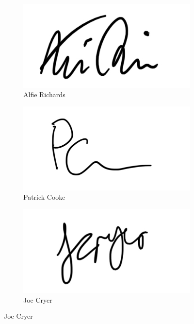 \documentclass[10pt]{article}
\begin{document}
\begin{center}
\begin{figure}[h]
  \centering

\begin{subfigure}{0.3\textwidth}
\includegraphics[width=0.9\linewidth]{SigAlfie}
\captionsetup{labelformat=empty}
\caption{Alfie Richards}
\end{subfigure}
\begin{subfigure}{0.3\textwidth}
\includegraphics[width=0.9\linewidth]{SigPatrick}
\captionsetup{labelformat=empty}
\caption{Patrick Cooke}
\end{subfigure}
\begin{subfigure}{0.3\textwidth}
\includegraphics[width=0.9\linewidth]{SigJoe}
\captionsetup{labelformat=empty}
\caption{Joe Cryer}
\end{subfigure}
\end{figure}


\end{center}
\end{document}
